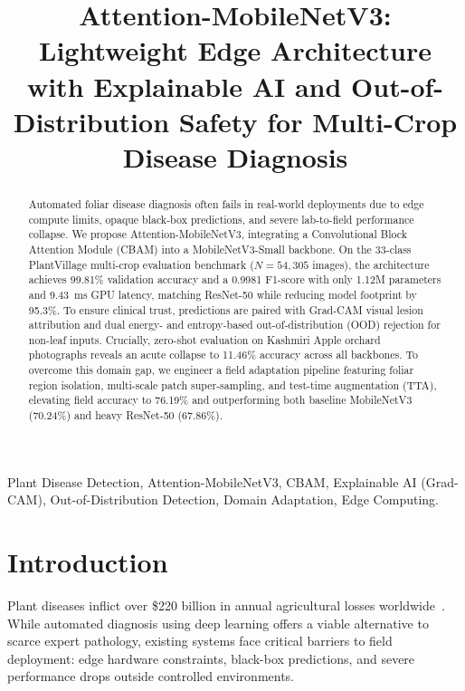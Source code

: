 \documentclass[conference]{IEEEtran}
\begin{document}
\title{Attention-MobileNetV3: Lightweight Edge Architecture with Explainable AI and Out-of-Distribution Safety for Multi-Crop Disease Diagnosis}

\author{
}

\maketitle

\begin{abstract}
Automated foliar disease diagnosis often fails in real-world deployments due to edge compute limits, opaque black-box predictions, and severe lab-to-field performance collapse. We propose Attention-MobileNetV3, integrating a Convolutional Block Attention Module (CBAM) into a MobileNetV3-Small backbone. On the 33-class PlantVillage multi-crop evaluation benchmark ($N = 54,305$ images), the architecture achieves 99.81\% validation accuracy and a 0.9981 F1-score with only 1.12M parameters and 9.43~ms GPU latency, matching ResNet-50 while reducing model footprint by 95.3\%. To ensure clinical trust, predictions are paired with Grad-CAM visual lesion attribution and dual energy- and entropy-based out-of-distribution (OOD) rejection for non-leaf inputs. Crucially, zero-shot evaluation on Kashmiri Apple orchard photographs reveals an acute collapse to 11.46\% accuracy across all backbones. To overcome this domain gap, we engineer a field adaptation pipeline featuring foliar region isolation, multi-scale patch super-sampling, and test-time augmentation (TTA), elevating field accuracy to 76.19\% and outperforming both baseline MobileNetV3 (70.24\%) and heavy ResNet-50 (67.86\%).
\end{abstract}

\begin{IEEEkeywords}
Plant Disease Detection, Attention-MobileNetV3, CBAM, Explainable AI (Grad-CAM), Out-of-Distribution Detection, Domain Adaptation, Edge Computing.
\end{IEEEkeywords}

\section{Introduction}
Plant diseases inflict over \$220 billion in annual agricultural losses worldwide~\cite{ref_fao}. While automated diagnosis using deep learning offers a viable alternative to scarce expert pathology, existing systems face critical barriers to field deployment: edge hardware constraints, black-box predictions, and severe performance drops outside controlled environments.
\end{document}
